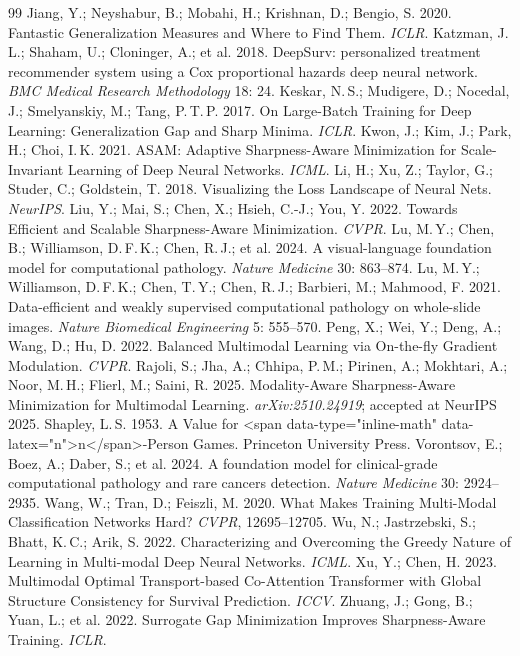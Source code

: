 \documentclass[10pt]{article}\usepackage[utf8]{inputenc}\usepackage[T1]{fontenc}\usepackage{amsmath,amssymb,amsfonts,bm}\usepackage{booktabs}\usepackage{multirow}\usepackage{array}\usepackage{graphicx}\usepackage{algorithm}\usepackage{algorithmic}\usepackage{xcolor}\usepackage[margin=1in]{geometry}\usepackage{microtype}
\begin{document}
\begin{thebibliography}{99}
 Jiang, Y.; Neyshabur, B.; Mobahi, H.; Krishnan, D.; Bengio, S. 2020. Fantastic Generalization Measures and Where to Find Them. \emph{ICLR}.
 Katzman, J.\,L.; Shaham, U.; Cloninger, A.; et al. 2018. DeepSurv: personalized treatment recommender system using a Cox proportional hazards deep neural network. \emph{BMC Medical Research Methodology} 18: 24.
 Keskar, N.\,S.; Mudigere, D.; Nocedal, J.; Smelyanskiy, M.; Tang, P.\,T.\,P. 2017. On Large-Batch Training for Deep Learning: Generalization Gap and Sharp Minima. \emph{ICLR}.
 Kwon, J.; Kim, J.; Park, H.; Choi, I.\,K. 2021. ASAM: Adaptive Sharpness-Aware Minimization for Scale-Invariant Learning of Deep Neural Networks. \emph{ICML}.
 Li, H.; Xu, Z.; Taylor, G.; Studer, C.; Goldstein, T. 2018. Visualizing the Loss Landscape of Neural Nets. \emph{NeurIPS}.
 Liu, Y.; Mai, S.; Chen, X.; Hsieh, C.-J.; You, Y. 2022. Towards Efficient and Scalable Sharpness-Aware Minimization. \emph{CVPR}.
 Lu, M.\,Y.; Chen, B.; Williamson, D.\,F.\,K.; Chen, R.\,J.; et al. 2024. A visual-language foundation model for computational pathology. \emph{Nature Medicine} 30: 863--874.
 Lu, M.\,Y.; Williamson, D.\,F.\,K.; Chen, T.\,Y.; Chen, R.\,J.; Barbieri, M.; Mahmood, F. 2021. Data-efficient and weakly supervised computational pathology on whole-slide images. \emph{Nature Biomedical Engineering} 5: 555--570.
 Peng, X.; Wei, Y.; Deng, A.; Wang, D.; Hu, D. 2022. Balanced Multimodal Learning via On-the-fly Gradient Modulation. \emph{CVPR}.
 Rajoli, S.; Jha, A.; Chhipa, P.\,M.; Pirinen, A.; Mokhtari, A.; Noor, M.\,H.; Flierl, M.; Saini, R. 2025. Modality-Aware Sharpness-Aware Minimization for Multimodal Learning. \emph{arXiv:2510.24919}; accepted at NeurIPS 2025.
 Shapley, L.\,S. 1953. A Value for <span data-type="inline-math" data-latex="n">n</span>-Person Games. Princeton University Press.
 Vorontsov, E.; Boez, A.; Daber, S.; et al. 2024. A foundation model for clinical-grade computational pathology and rare cancers detection. \emph{Nature Medicine} 30: 2924--2935.
 Wang, W.; Tran, D.; Feiszli, M. 2020. What Makes Training Multi-Modal Classification Networks Hard? \emph{CVPR}, 12695--12705.
 Wu, N.; Jastrzebski, S.; Bhatt, K.\,C.; Arik, S. 2022. Characterizing and Overcoming the Greedy Nature of Learning in Multi-modal Deep Neural Networks. \emph{ICML}.
 Xu, Y.; Chen, H. 2023. Multimodal Optimal Transport-based Co-Attention Transformer with Global Structure Consistency for Survival Prediction. \emph{ICCV}.
 Zhuang, J.; Gong, B.; Yuan, L.; et al. 2022. Surrogate Gap Minimization Improves Sharpness-Aware Training. \emph{ICLR}.
\end{thebibliography}
\end{document}
